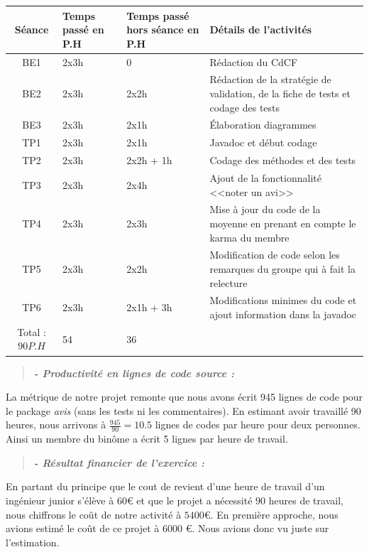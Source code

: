 \documentclass[12pt,a4paper]{report}
\begin{document}
\begin{flushleft}
\begin{tabular}{|c|p{3cm}|p{3cm}|p{7cm}|} 
\hline 
Séance & Temps passé en P.H & Temps passé hors séance en P.H & Détails de l'activités \\ 
\hline 
BE1 & 2x3h & 0 & Rédaction du CdCF \\ 
\hline 
BE2 & 2x3h & 2x2h & Rédaction de la stratégie de validation, de la fiche de tests et codage des tests \\ 
\hline 
BE3 & 2x3h & 2x1h & Élaboration diagrammes \\ 
\hline 
TP1 & 2x3h & 2x1h & Javadoc et début codage \\ 
\hline 
TP2 & 2x3h & 2x2h + 1h & Codage des méthodes et des tests \\ 
\hline 
TP3 & 2x3h & 2x4h & Ajout de la fonctionnalité <<noter un avi>> \\ 
\hline 
TP4 & 2x3h & 2x3h & Mise à jour du code de la moyenne en prenant en compte le karma du membre  \\ 
\hline 
TP5 & 2x3h & 2x2h & Modification de code selon les remarques du groupe qui à fait la relecture \\
\hline 
TP6 & 2x3h & 2x1h + 3h & Modifications minimes du code et ajout information dans la javadoc\\
\hline
Total : $90 P.H$ & 54  & 36 &\\ 
\hline 
\end{tabular} 
\end{flushleft}

\begin{quotation}
\textbf{\textit{ - Productivité en lignes de code source :}}
\end{quotation}

La métrique de notre projet remonte que nous avons écrit 945 lignes de code pour le package \emph{avis} (sans les tests ni les commentaires). En estimant avoir travaillé 90 heures, nous arrivons à $\frac{945}{90} = 10.5$ lignes de codes par heure pour deux personnes. Ainsi un membre du binôme a écrit 5 lignes par heure de travail. 

\begin{quotation}
\textbf{\textit{ - Résultat financier de l'exercice :}}
\end{quotation}

En partant du principe que le cout de revient d'une heure de travail d'un ingénieur junior s'élève à 60\euro{}  et que le projet a nécessité $90$ heures de travail, nous chiffrons le coût de notre activité à $5400$\euro{}. En première approche, nous avions estimé le coût de ce projet à $6000$ \euro{}. Nous avions donc vu juste sur l'estimation.
\end{document}
